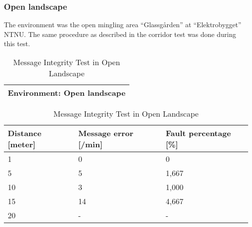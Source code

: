 \newpage
\subsubsection{Open landscape}
The environment was the open mingling area ``Glassgården'' at ``Elektrobygget'' NTNU. 
The same procedure as described in the corridor test was done during this test.

\begin{table}[ht]
\begin{center}
 \begin{tabular}{|l|} 
 \hline
 Environment: \textbf{Open landscape}\\
 \hline
 \end{tabular}
 \begin{tabular}{|l|l|l|}
 \hline
 Distance [meter] & Message error [/min] &  Fault percentage [\%]\\
 \hline
 1		        &   0 		&	0    \\
 5              &   5  		&	1,667\\
 10             &   3  		&	1,000\\
 15				&	14 		&	4,667\\
 20				&	-  		&	-	\\
 \hline
\end{tabular}
\end{center}
\caption{Message Integrity Test in Open Landscape}
\label{tab:messintegrityopen}
\end{table}